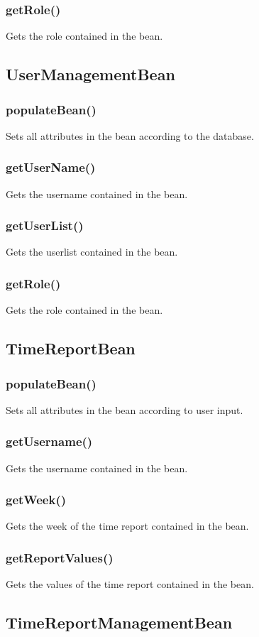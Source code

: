 \documentclass{article}
\begin{document}
\subsubsection{getRole()}
Gets the role contained in the bean.

\subsection{UserManagementBean}
\subsubsection{populateBean()}
Sets all attributes in the bean according to the database.
\subsubsection{getUserName()}
Gets the username contained in the bean.
\subsubsection{getUserList()}
Gets the userlist contained in the bean.
\subsubsection{getRole()}
Gets the role contained in the bean.
\subsection{TimeReportBean}
\subsubsection{populateBean()}
Sets all attributes in the bean according to user input.
\subsubsection{getUsername()}
Gets the username contained in the bean.
\subsubsection{getWeek()}
Gets the week of the time report contained in the bean.
\subsubsection{getReportValues()}
Gets the values of the time report contained in the bean.

\subsection{TimeReportManagementBean}
\end{document}
